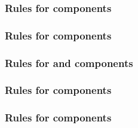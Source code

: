 \begin{sbmlenum}

\end{sbmlenum} \subsubsection*{Rules for  components} \begin{sbmlenum}


\end{sbmlenum} \subsubsection*{Rules for  components} \begin{sbmlenum}


\end{sbmlenum} \subsubsection*{Rules for  and  components} \begin{sbmlenum}


\end{sbmlenum} \subsubsection*{Rules for  components} \begin{sbmlenum}


\end{sbmlenum} \subsubsection*{Rules for  components} \begin{sbmlenum}


\end{sbmlenum}
